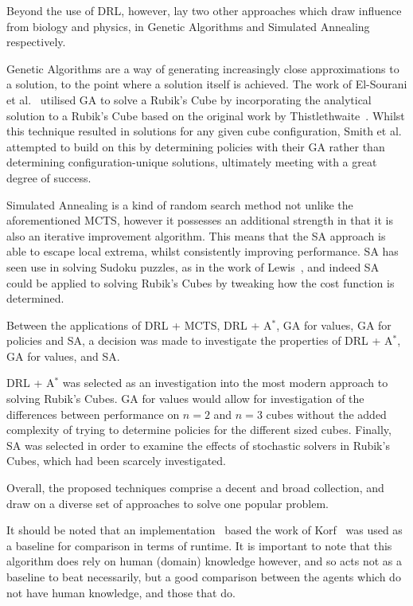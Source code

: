 \documentclass[UKenglish]{libraries/svproc}
\begin{document}
Beyond the use of DRL, however, lay two other approaches which draw influence from biology and physics, in Genetic Algorithms and Simulated Annealing respectively.

Genetic Algorithms are a way of generating increasingly close approximations to a solution, to the point where a solution itself is achieved. The work of El-Sourani et al.~\cite{10.1007/978-3-642-12239-2_9} utilised GA to solve a Rubik's Cube by incorporating the analytical solution to a Rubik's Cube based on the original work by Thistlethwaite~\cite{Thistlethwaite}. Whilst this technique resulted in solutions for any given cube configuration, Smith et al.~\cite{10.1145/2908812.2908887} attempted to build on this by determining policies with their GA rather than determining configuration-unique solutions, ultimately meeting with a great degree of success.

Simulated Annealing is a kind of random search method not unlike the aforementioned MCTS, however it possesses an additional strength in that it is also an iterative improvement algorithm. This means that the SA approach is able to escape local extrema, whilst consistently improving performance. SA has seen use in solving Sudoku puzzles, as in the work of Lewis~\cite{SAarticle}, and indeed SA could be applied to solving Rubik's Cubes by tweaking how the cost function is determined.

Between the applications of DRL + MCTS, DRL + A$^{\ast}$, GA for values, GA for policies and SA, a decision was made to investigate the properties of DRL + A$^{\ast}$, GA for values, and SA.

DRL + A$^{\ast}$ was selected as an investigation into the most modern approach to solving Rubik's Cubes. GA for values would allow for investigation of the differences between performance on $n=2$ and $n=3$ cubes without the added complexity of trying to determine policies for the different sized cubes. Finally, SA was selected in order to examine the effects of stochastic solvers in Rubik's Cubes, which had been scarcely investigated.

Overall, the proposed techniques comprise a decent and broad collection, and draw on a diverse set of approaches to solve one popular problem.

It should be noted that an implementation~\cite{Shoukat2019} based the work of Korf~\cite{KORF198597} was used as a baseline for comparison in terms of runtime. It is important to note that this algorithm does rely on human (domain) knowledge however, and so acts not as a baseline to beat necessarily, but a good comparison between the agents which do not have human knowledge, and those that do.
\end{document}
